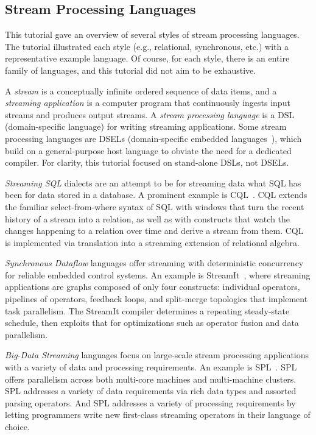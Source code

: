 \subsection{Stream Processing Languages}\label{sec:tut_lang}

This tutorial gave an overview of several styles of stream processing
languages. The tutorial illustrated each style (e.g., relational,
synchronous, etc.) with a representative example language. Of course,
for each style, there is an entire family of languages, and this
tutorial did not aim to be exhaustive.

A \emph{stream} is a conceptually infinite ordered sequence of data
items, and a \emph{streaming application} is a computer program that
continuously ingests input streams and produces output streams.  A
\emph{stream processing language} is a DSL (domain-specific language)
for writing streaming applications. Some stream processing languages
are DSELs (domain-specific embedded languages~\cite{hudak_1998}),
which build on a general-purpose host language to obviate the need for
a dedicated compiler. For clarity, this tutorial focused on
stand-alone DSLs, not DSELs.

\emph{Streaming SQL} dialects are an attempt to be for streaming data
what SQL has been for data stored in a database. A prominent example
is CQL~\cite{arasu_babu_widom_2006}. CQL extends the familiar
select-from-where syntax of SQL with windows that turn the recent
history of a stream into a relation, as well as with constructs that
watch the changes happening to a relation over time and derive a
stream from them. CQL is implemented via translation into a streaming
extension of relational algebra.

\emph{Synchronous Dataflow} languages offer streaming with
deterministic concurrency for reliable embedded control systems. An
example is StreamIt~\cite{thies_et_al_2002}, where streaming
applications are graphs composed of only four constructs: individual
operators, pipe\-lines of operators, feedback loops, and split-merge
topologies that implement task parallelism. The StreamIt compiler
determines a repeating steady-state schedule, then exploits that for
optimizations such as operator fusion and data parallelism.

\emph{Big-Data Streaming} languages focus on large-scale stream
processing applications with a variety of data and processing
requirements. An example is SPL~\cite{hirzel_schneider_gedik_2017}.
SPL offers parallelism across both multi-core machines and
multi-machine clusters. SPL addresses a variety of data requirements
via rich data types and assorted parsing operators. And SPL addresses
a variety of processing requirements by letting programmers write new
first-class streaming operators in their language of choice.

